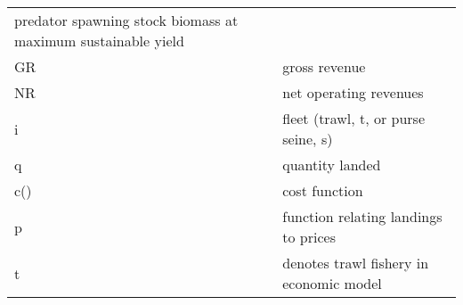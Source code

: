 \documentclass[]{article}
\begin{document}
\begin{longtable}[]{@{}ll@{}}
\begin{minipage}[t]{0.76\columnwidth}
predator spawning stock biomass at maximum sustainable yield\strut
\end{minipage}\tabularnewline
\begin{minipage}[t]{0.13\columnwidth}\raggedright\strut
GR\strut
\end{minipage} & \begin{minipage}[t]{0.76\columnwidth}\raggedright\strut
gross revenue\strut
\end{minipage}\tabularnewline
\begin{minipage}[t]{0.13\columnwidth}\raggedright\strut
NR\strut
\end{minipage} & \begin{minipage}[t]{0.76\columnwidth}\raggedright\strut
net operating revenues\strut
\end{minipage}\tabularnewline
\begin{minipage}[t]{0.13\columnwidth}\raggedright\strut
i\strut
\end{minipage} & \begin{minipage}[t]{0.76\columnwidth}\raggedright\strut
fleet (trawl, t, or purse seine, s)\strut
\end{minipage}\tabularnewline
\begin{minipage}[t]{0.13\columnwidth}\raggedright\strut
q\strut
\end{minipage} & \begin{minipage}[t]{0.76\columnwidth}\raggedright\strut
quantity landed\strut
\end{minipage}\tabularnewline
\begin{minipage}[t]{0.13\columnwidth}\raggedright\strut
c()\strut
\end{minipage} & \begin{minipage}[t]{0.76\columnwidth}\raggedright\strut
cost function\strut
\end{minipage}\tabularnewline
\begin{minipage}[t]{0.13\columnwidth}\raggedright\strut
p\strut
\end{minipage} & \begin{minipage}[t]{0.76\columnwidth}\raggedright\strut
function relating landings to prices\strut
\end{minipage}\tabularnewline
\begin{minipage}[t]{0.13\columnwidth}\raggedright\strut
t\strut
\end{minipage} & \begin{minipage}[t]{0.76\columnwidth}\raggedright\strut
denotes trawl fishery in economic model\strut
\end{minipage}\tabularnewline

\end{longtable}
\end{document}

